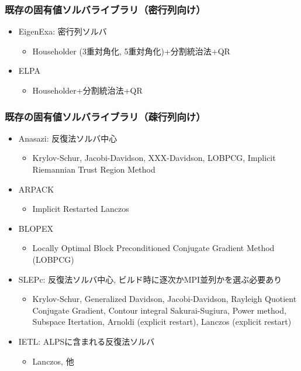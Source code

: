 \begin{frame}
  \frametitle{既存の固有値ソルバライブラリ（密行列向け）}
  \begin{itemize}
  \item EigenExa: 密行列ソルバ
    \begin{itemize}
      \item Householder (3重対角化, 5重対角化)+分割統治法+QR
    \end{itemize}
  \item ELPA
    \begin{itemize}
      \item Householder+分割統治法+QR
    \end{itemize}
  \end{itemize}
\end{frame}

\begin{frame}
  \frametitle{既存の固有値ソルバライブラリ（疎行列向け）}
  \begin{itemize}
  \item Anasazi: 反復法ソルバ中心
    \begin{itemize}
      \item Krylov-Schur, Jacobi-Davidson, XXX-Davidson, LOBPCG, Implicit Riemannian Trust Region Method
    \end{itemize}
  \item ARPACK
    \begin{itemize}
      \item Implicit Restarted Lanczos
    \end{itemize}
  \item BLOPEX
    \begin{itemize}
    \item Locally Optimal Block Preconditioned Conjugate Gradient Method (LOBPCG)
    \end{itemize}
  \item SLEPc: 反復法ソルバ中心, ビルド時に逐次かMPI並列かを選ぶ必要あり
    \begin{itemize}
      \item Krylov-Schur, Generalized Davidson, Jacobi-Davidson, Rayleigh Quotient Conjugate Gradient, Contour integral Sakurai-Sugiura, Power method, Subspace Itertation, Arnoldi (explicit restart), Lanczos (explicit restart) \\
    \end{itemize}
  \item IETL: ALPSに含まれる反復法ソルバ
    \begin{itemize}
      \item Lanczos, 他
    \end{itemize}
  \end{itemize}
\end{frame}

